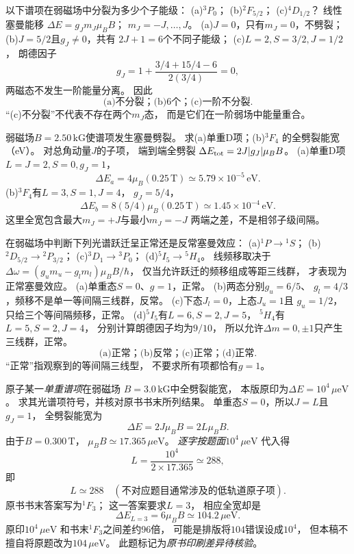 以下谱项在弱磁场中分裂为多少个子能级：
(a)\({}^{3}P_0\)；
(b)\({}^{2}F_{5/2}\)；
(c)\({}^{4}D_{1/2}\)？
\exsolution
线性塞曼能移
$\Delta E=g_J m_J\mu_BB$；
$m_J=-J,\ldots,J$。
(a)$J=0$，只有$m_J=0$，不劈裂；
(b)$J=5/2$且$g_J\ne0$，共有
$2J+1=6$个不同子能级；
(c)$L=2,S=3/2,J=1/2$，
朗德因子
\[
 g_J=1+\frac{3/4+15/4-6}{2(3/4)}=0,
\]
两磁态不发生一阶能量分离。
因此
\[
 \boxed{\text{(a)不分裂；(b)6个；(c)一阶不分裂}}.
\]
\excheck “(c)不分裂”不代表不存在两个$m_J$态，
而是它们在一阶弱场中能量重合。

弱磁场$B=2.50\,\mathrm{kG}$使谱项发生塞曼劈裂。
求(a)单重D项；(b)\({}^{3}F_4\)
的全劈裂能宽（eV）。
\exsolution
对总角动量$J$的子项，
端到端全劈裂
$\Delta E_{\rm tot}=2J|g_J|\mu_BB$。
(a)单重D项$L=J=2,S=0,g_J=1$，
\[
 \boxed{\Delta E_a=4\mu_B(0.25\,\mathrm T)
 \simeq5.79\times10^{-5}\,\mathrm{eV}}.
\]
(b)\({}^{3}F_4\)有$L=3,S=1,J=4$，
$g_J=5/4$，
\[
 \boxed{\Delta E_b=8(5/4)\mu_B(0.25\,\mathrm T)
 \simeq1.45\times10^{-4}\,\mathrm{eV}}.
\]
\excheck 这里全宽包含最大$m_J=+J$与最小$m_J=-J$
两端之差，不是相邻子级间隔。

在弱磁场中判断下列光谱跃迁呈正常还是反常塞曼效应：
(a)\({}^{1}P\to{}^{1}S\)；
(b)\({}^{2}D_{5/2}\to{}^{2}P_{3/2}\)；
(c)\({}^{3}D_1\to{}^{3}P_0\)；
(d)\({}^{5}I_5\to{}^{5}H_4\)。
\exsolution
线频移取决于
$\Delta\omega=(g_um_u-g_lm_l)\mu_BB/\hbar$，
仅当允许跃迁的频移组成等距三线群，
才表现为正常塞曼效应。
(a)单重态$S=0$、$g=1$，正常。
(b)两态分别$g_u=6/5$、
$g_l=4/3$，频移不是单一等间隔三线群，反常。
(c)下态$J_l=0$，上态$J_u=1$且
$g_u=1/2$，
只给三个等间隔频移，正常。
(d)\({}^{5}I_5\)有$L=6,S=2,J=5$，
\({}^{5}H_4\)有$L=5,S=2,J=4$，
分别计算朗德因子均为$9/10$，
所以允许$\Delta m=0,\pm1$只产生三线群，正常。
\[
 \boxed{\text{(a)正常；(b)反常；(c)正常；(d)正常}}.
\]
\excheck “正常”指观察到的等间隔三线型，
不要求所有项都恰有$g=1$。

原子某一\emph{单重谱项}在弱磁场
$B=3.0\,\mathrm{kG}$中全劈裂能宽，
本版原印为$\Delta E=10^{4}\,\mu\mathrm{eV}$。
求其光谱项符号，并核对原书书末所列结果。
\exsolution
单重态$S=0$，所以$J=L$且$g_J=1$，
全劈裂能宽为
\[
 \Delta E=2J\mu_BB=2L\mu_BB.
\]
由于$B=0.300\,\mathrm T$，
$\mu_B B\simeq17.365\,\mu\mathrm{eV}$。
\emph{逐字按题面}$10^4\,\mu\mathrm{eV}$
代入得
\[
 L=\frac{10^4}{2\times17.365}\simeq288,
\]
即
\[
 \boxed{L\simeq288\quad
 (\text{不对应题目通常涉及的低轨道原子项})}.
\]
原书书末答案写为\({}^{1}F_3\)；
这一答案要求$L=3$，
相应全宽却是
\[
 \boxed{\Delta E_{L=3}=6\mu_BB
 \simeq104.2\,\mu\mathrm{eV}}.
\]
\excheck 原印$10^{4}\,\mu\mathrm{eV}$
和书末\({}^{1}F_3\)之间差约96倍，
可能是排版将$104$错误设成$10^4$，
但本稿不擅自将原题改为$104\,\mu\mathrm{eV}$。
此题标记为\emph{原书印刷差异待核验}。


